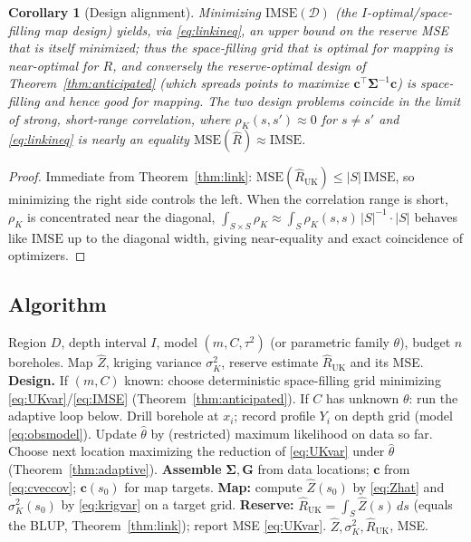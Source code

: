\documentclass{amsart}
\newtheorem{corollary}[theorem]{Corollary}
\theoremstyle{definition}
\newcommand{\Rhat}{\widehat R}
\newcommand{\Zhat}{\widehat Z}
\begin{document}
\begin{corollary}[Design alignment]
Minimizing $\mathrm{IMSE}(\mathcal D)$ (the $I$-optimal/space-filling map
design) yields, via \eqref{eq:linkineq}, an upper bound on the reserve MSE
that is itself minimized; thus the space-filling grid that is optimal for
mapping is near-optimal for $R$, and conversely the reserve-optimal design
of Theorem~\ref{thm:anticipated} (which spreads points to maximize
$\mathbf c^\top\boldsymbol\Sigma^{-1}\mathbf c$) is space-filling and hence
good for mapping. The two design problems coincide in the limit of strong,
short-range correlation, where $\rho_K(s,s')\approx0$ for $s\ne s'$ and
\eqref{eq:linkineq} is nearly an equality
$\mathrm{MSE}(\Rhat)\approx\mathrm{IMSE}$.
\end{corollary}
\begin{proof}
Immediate from Theorem~\ref{thm:link}: $\mathrm{MSE}(\Rhat_{\mathrm{UK}})
\le|S|\,\mathrm{IMSE}$, so minimizing the right side controls the left.
When the correlation range is short, $\rho_K$ is concentrated near the
diagonal, $\int_{S\times S}\rho_K\approx\int_S\rho_K(s,s)\,|S|^{-1}\cdot|S|$
behaves like $\mathrm{IMSE}$ up to the diagonal width, giving near-equality
and exact coincidence of optimizers.
\end{proof}

\subsection{Algorithm}

\begin{algorithm}[h]
\caption{Sampling-and-mapping for reserve estimation}
\begin{algorithmic}[1]
\Require Region $D$, depth interval $I$, model $(m,C,\tau^2)$ (or
parametric family $\theta$), budget $n$ boreholes.
\Ensure Map $\Zhat$, kriging variance $\sigma_K^2$, reserve estimate
$\Rhat_{\mathrm{UK}}$ and its MSE.
\State \textbf{Design.} If $(m,C)$ known: choose deterministic
space-filling grid minimizing \eqref{eq:UKvar}/\eqref{eq:IMSE}
(Theorem~\ref{thm:anticipated}). If $C$ has unknown $\theta$: run the
adaptive loop below.
  \State Drill borehole at $x_i$; record profile $Y_i$ on depth grid
  (model \eqref{eq:obsmodel}).
     \State Update $\widehat\theta$ by (restricted) maximum likelihood on
     data so far.
     \State Choose next location maximizing the reduction of
     \eqref{eq:UKvar} under $\widehat\theta$ (Theorem~\ref{thm:adaptive}).
  \EndIf
\EndFor
\State \textbf{Assemble} $\boldsymbol\Sigma,\mathbf G$ from data locations;
$\mathbf c$ from \eqref{eq:cveccov}; $\mathbf c(s_0)$ for map targets.
\State \textbf{Map:} compute $\Zhat(s_0)$ by \eqref{eq:Zhat} and
$\sigma_K^2(s_0)$ by \eqref{eq:krigvar} on a target grid.
\State \textbf{Reserve:} $\Rhat_{\mathrm{UK}}=\int_S\Zhat(s)\,ds$ (equals
the BLUP, Theorem~\ref{thm:link}); report MSE \eqref{eq:UKvar}.
\State \Return $\Zhat,\sigma_K^2,\Rhat_{\mathrm{UK}}$, MSE.
\end{algorithmic}
\end{algorithm}
\end{document}
